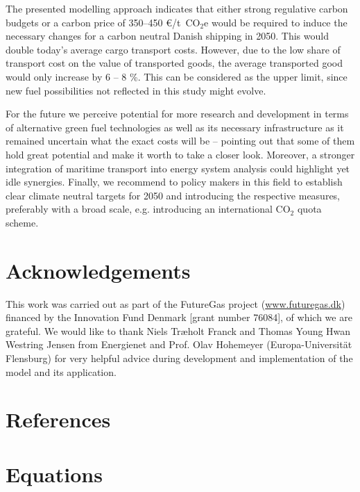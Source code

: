\documentclass[article]{elsarticle}
\begin{document}
The presented modelling approach indicates that either strong regulative carbon budgets or a carbon price of 350--450 \euro/t~CO$_2$e would be required to induce the necessary changes for a carbon neutral Danish shipping in 2050. This would double today's average cargo transport costs. However, due to the low share of transport cost on the value of transported goods, the average transported good would only increase by 6 -- 8 \%. This can be considered as the upper limit, since new fuel possibilities not reflected in this study might evolve.

For the future we perceive potential for more research and development in terms of alternative green fuel technologies as well as its necessary infrastructure as it remained uncertain what the exact costs will be -- pointing out that some of them hold great potential and make it worth to take a closer look. Moreover, a stronger integration of maritime transport into energy system analysis could highlight yet idle synergies. Finally, we recommend to policy makers in this field to establish clear climate neutral targets for 2050 and introducing the respective measures, preferably with a broad scale, e.g. introducing an international CO$_2$ quota scheme.


\section*{Acknowledgements}
This work was carried out as part of the FutureGas project (\url{www.futuregas.dk}) financed by the Innovation Fund Denmark [grant number 76084], of which we are grateful. We would like to thank Niels Tr\ae holt Franck and Thomas Young Hwan Westring Jensen from Energienet and Prof. Olav Hohemeyer (Europa-Universit\"at Flensburg) for very helpful advice during development and implementation of the model and its application.


\section*{References}


\newpage
\appendix
\section{Equations}\label{app:equations}
\end{document}
